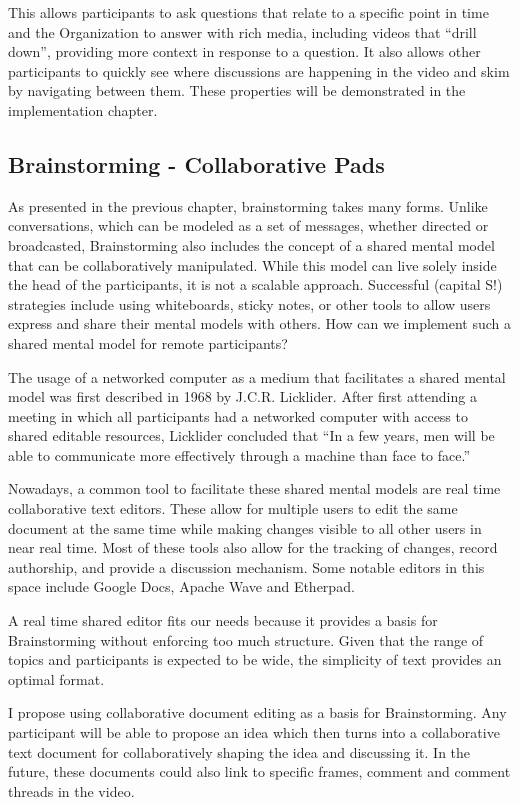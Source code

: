 This allows participants to ask questions that relate to a specific point in time and the Organization to answer with rich media, including videos that “drill down”, providing more context in response to a question. It also allows other participants to quickly see where discussions are happening in the video and skim by navigating between them. These properties will be demonstrated in the implementation chapter.

\subsection{Brainstorming - Collaborative Pads}

As presented in the previous chapter, brainstorming takes many forms. Unlike conversations, which can be modeled as a set of messages, whether directed or broadcasted, Brainstorming also includes the concept of a shared mental model that can be collaboratively manipulated. While this model can live solely inside the head of the participants, it is not a scalable approach. Successful (capital S!) strategies include using whiteboards, sticky notes, or other tools to allow users express and share their mental models with others. How can we implement such a shared mental model for remote participants?

The usage of a networked computer as a medium that facilitates a shared mental model was first described in 1968 by J.C.R. Licklider. After first attending a meeting in which all participants had a networked computer with access to shared editable resources, Licklider concluded that ``In a few years, men will be able to communicate more effectively through a machine than face to face.''\cite{licklider1968computer}

Nowadays, a common tool to facilitate these shared mental models are real time collaborative text editors. These allow for multiple users to edit the same document at the same time while making changes visible to all other users in near real time. Most of these tools also allow for the tracking of changes, record authorship, and provide a discussion mechanism. Some notable editors in this space include Google Docs\cite{gdocs}, Apache Wave\cite{wave} and Etherpad\cite{etherpad}. 

A real time shared editor fits our needs because it provides a basis for Brainstorming without enforcing too much structure. Given that the range of topics and participants is expected to be wide, the simplicity of text provides an optimal format. 

I propose using collaborative document editing as a basis for Brainstorming. Any participant will be able to propose an idea which then turns into a collaborative text document for collaboratively shaping the idea and discussing it. In the future, these documents could also link to specific frames, comment and comment threads in the video. 